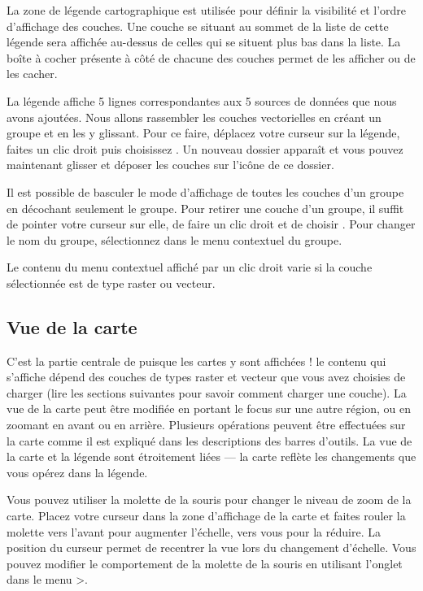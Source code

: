 La zone de légende cartographique est utilisée pour définir la visibilité et l'ordre d'affichage des couches. Une couche se situant au sommet de la liste de cette légende sera affichée au-dessus de celles qui se situent plus bas dans la liste. La boîte à cocher présente à côté de chacune des couches permet de les afficher ou de les cacher.

La légende affiche 5 lignes correspondantes aux 5 sources de données que nous avons ajoutées. Nous allons rassembler les couches vectorielles en créant un groupe et en les y glissant. Pour ce faire, déplacez votre curseur sur la légende, faites un clic droit puis choisissez . Un nouveau dossier apparaît et vous pouvez maintenant glisser et déposer les couches sur l'icône de ce dossier. 

Il est possible de basculer le mode d'affichage de toutes les couches d'un groupe en décochant seulement le groupe. Pour retirer une couche d'un groupe, il suffit de pointer votre curseur sur elle, de faire un clic droit et de choisir . Pour changer le nom du groupe, sélectionnez  dans le menu contextuel du groupe.

Le contenu du menu contextuel affiché par un clic droit varie si la couche sélectionnée est de type raster ou vecteur.

\subsection{Vue de la carte}\label{ui_vue}

C'est la partie centrale de \qg puisque les cartes y sont affichées ! le contenu qui s'affiche dépend des couches de types raster et vecteur que vous avez choisies de charger (lire les sections suivantes pour savoir comment charger une couche). La vue de la carte peut être modifiée en portant le focus sur une autre région, ou en zoomant en avant ou en arrière. Plusieurs opérations peuvent être effectuées sur la carte comme il est expliqué dans les descriptions des barres d'outils. La vue de la carte et la légende sont étroitement liées — la carte reflète les changements que vous opérez dans la légende.

Vous pouvez utiliser la molette de la souris pour changer le niveau de zoom de la carte. Placez votre curseur dans la zone d'affichage de la carte et faites rouler la molette vers l'avant pour augmenter l'échelle, vers vous pour la réduire. La position du curseur permet de recentrer la vue lors du changement d'échelle. Vous pouvez modifier le comportement de la molette de la souris en utilisant l'onglet  dans le menu  >.

